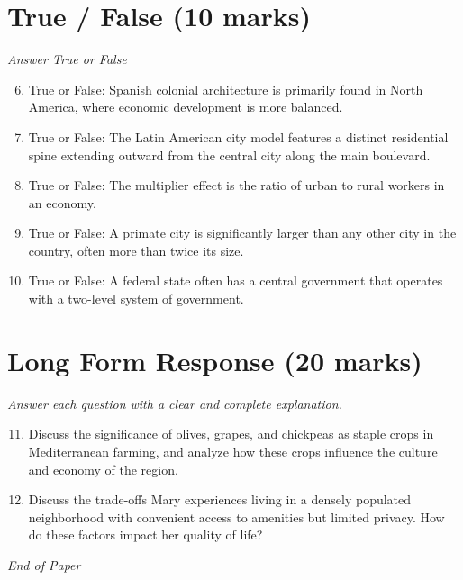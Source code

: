 \documentclass[12pt]{article}
\begin{document}
\section*{True / False (10 marks)}
\textit{Answer True or False}
\begin{enumerate}[label=\arabic*.]
\setcounter{enumi}{5}
\item True or False: Spanish colonial architecture is primarily found in North America, where economic development is more balanced.
\item True or False: The Latin American city model features a distinct residential spine extending outward from the central city along the main boulevard.
\item True or False: The multiplier effect is the ratio of urban to rural workers in an economy.
\item True or False: A primate city is significantly larger than any other city in the country, often more than twice its size.
\item True or False: A federal state often has a central government that operates with a two-level system of government.
\end{enumerate}

\section*{Long Form Response (20 marks)}
\textit{Answer each question with a clear and complete explanation.}
\begin{enumerate}[label=\arabic*.]
\setcounter{enumi}{10}
\item Discuss the significance of olives, grapes, and chickpeas as staple crops in Mediterranean farming, and analyze how these crops influence the culture and economy of the region.
\item Discuss the trade-offs Mary experiences living in a densely populated neighborhood with convenient access to amenities but limited privacy. How do these factors impact her quality of life?
\end{enumerate}

\vfill
\noindent\textit{End of Paper}
\end{document}
